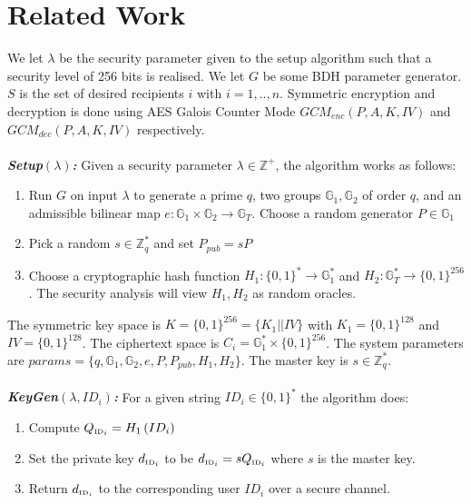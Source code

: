 \documentclass[11pt]{article}
\begin{document}
\section*{Related Work}
We let $\lambda$ be the security parameter given to the setup algorithm such that a security level of 256 bits is realised. We let $G$ be some BDH parameter generator. $S$ is the set of desired recipients $i$ with $i = 1,..,n$. Symmetric encryption and decryption is done using AES Galois Counter Mode  $GCM_{enc} \left( P, A, K, IV \right)$ and  $GCM_{dec} \left( P, A, K, IV \right)$ respectively.\\
\\
\textbf{\textit{Setup$\left( \lambda \right)$:}} Given a security parameter $\lambda \in \mathds{Z}^{+}$, the algorithm works as follows:
\begin{enumerate}
 \item Run $G$ on input $\lambda$ to generate a prime $q$, two groups $\mathds{G}_1, \mathds{G}_2$ of order $q$, and an admissible bilinear map $e: \mathds{G}_1 \times \mathds{G}_2 \rightarrow \mathds{G}_T$. Choose a random generator $P \in \mathds{G}_1$
 \item Pick a random $s \in \mathds{Z}^{*}_q$ and set $P_{pub} = sP$
 \item Choose a cryptographic hash function $H_1: \{ 0,1 \}^{*} \rightarrow \mathds{G}_1^{*}$ and $H_2: \mathds{G}_T^{*} \rightarrow \{ 0,1 \}^{256}$. The security analysis will view $H_1, H_2$ as random oracles.
\end{enumerate}

The symmetric key space is $K = \{ 0,1 \}^{256} = \{ K_1 || IV \}$ with $K_1 = \{ 0,1 \}^{128}$ and $IV = \{ 0,1 \}^{128}$. The ciphertext space is $C_i = \mathds{G}_1^{*} \times \{ 0,1 \}^{256}$. The system parameters are $params = \{ q, \mathds{G}_1, \mathds{G}_2, e, P, P_{pub}, H_1, H_2  \}$. The master key is $s \in \mathds{Z}_q^{*}$.\\
\\
\textbf{\textit{KeyGen$\left( \lambda,ID_i \right)$:}} For a given string $ID_i \in \{ 0,1 \}^{*}$ the algorithm does:
\begin{enumerate}
 \item Compute $Q_{\textrm{\tiny{ID}}_i} = H_1 \left( ID_{i} \right)$
 \item Set the private key $d_{\textrm{\tiny{ID}}_i}$ to be $d_{\textrm{\tiny{ID}}_i} = s Q_{\textrm{\tiny{ID}}_i}$ where $s$ is the master key.
 \item Return $d_{\textrm{\tiny{ID}}_i}$ to the corresponding user $ID_i$ over a secure channel.
\end{enumerate}
\end{document}
